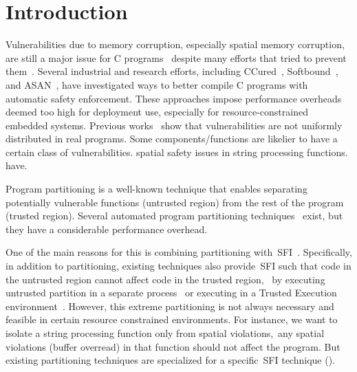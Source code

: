 \section{Introduction}\label{sec:intros}

Vulnerabilities due to memory corruption, especially spatial memory corruption, 
are still a major issue for C programs~\cite{cvetrend, microsoftmemsafe, Zeng:2013:SRF:2534766.2534798} 
despite many efforts that tried to prevent them~\cite{song2019sanitizing}.
Several industrial and research efforts, including CCured~\cite{Necula2005},
Softbound~\cite{softbound}, and ASAN~\cite{Serebryany2012},
have investigated ways to better compile C programs with automatic safety enforcement.
These approaches impose performance overheads deemed too high for deployment use, especially for resource-constrained embedded systems.
%
Previous works~\cite{meng2021bran, du2019leopard} show that vulnerabilities are not uniformly distributed in real programs.
Some components/functions are likelier to have a certain class of vulnerabilities.
\eg{} spatial safety issues in string processing functions.
have.

Program partitioning is a well-known technique that enables separating potentially vulnerable functions (untrusted region) from the rest of the program (trusted region).
%
Several automated program partitioning techniques~\cite{tan2017principles, brumley2004privtrans, bittau2008wedge, lind2017glamdring, liu2017ptrsplit} exist, but they have a considerable performance overhead. 

One of the main reasons for this is combining partitioning with~\acf{SFI}~\cite{wahbe1993efficient}.
Specifically, in addition to partitioning, existing techniques also provide~\ac{SFI} such that code in the untrusted region cannot affect code in the trusted region,~\eg{} by executing untrusted partition in a separate process~\cite{liu2017ptrsplit} or executing in a Trusted Execution environment~\cite{lind2017glamdring}.
However, this extreme partitioning is not always necessary and feasible in certain resource constrained environments.
For instance, we want to isolate a string processing function only from spatial violations,~\ie any spatial violations (\eg buffer overread) in that function should not affect the program.
%
But existing partitioning techniques are specialized for a specific~\ac{SFI} technique ().

